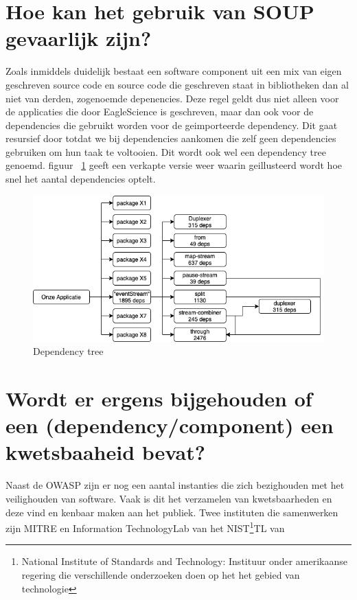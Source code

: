 
\section{Hoe kan het gebruik van SOUP gevaarlijk zijn?}\label{sec:hoe-kan-het-gebruik-van-soup-gevaarlijk-zijn?}
Zoals inmiddels duidelijk bestaat een software component uit een mix van eigen geschreven source code en source code die geschreven staat in bibliotheken dan al niet van derden, zogenoemde depenencies. Deze regel geldt dus niet alleen voor de applicaties die door EagleScience is geschreven, maar dan ook voor de dependencies die gebruikt worden voor de geimporteerde dependency. Dit gaat resursief door totdat we bij dependencies aankomen die zelf geen dependencies gebruiken om hun taak te voltooien. Dit wordt ook wel een dependency tree genoemd. figuur ~\ref{fig:dependency-tree} geeft een verkapte versie weer waarin geillusteerd wordt hoe snel het aantal dependencies optelt.
\begin{figure}[H]
    \myfloatalign
    \includegraphics[width=12cm]{gfx/dependency-tree}
    \caption{Dependency tree}\label{fig:dependency-tree}
\end{figure}




\section{Wordt er ergens bijgehouden of een (dependency/component) een kwetsbaaheid bevat?}\label{sec:item-wordt-er-ergens-bijgehouden-of-een-dependency/component)-een-kwetsbaaheid-bevat?}
Naast de OWASP zijn er nog een aantal instanties die zich bezighouden met het veilighouden van software. Vaak is dit het verzamelen van kwetsbaarheden en deze vind en kenbaar maken aan het publiek. Twee instituten die samenwerken zijn MITRE en Information TechnologyLab van het NIST\footnote{National Institute of Standards and Technology: Instituur onder amerikaanse regering die verschillende onderzoeken doen op het het gebied van technologie}TL van

